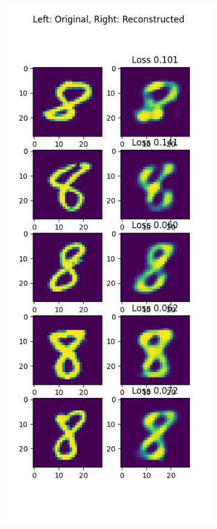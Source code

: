 \begin{solve}
\begin{figure}[H]
\begin{subfigure}{.5\textwidth}
      \end{subfigure}
      \end{figure}
        \begin{figure}[H]
            \begin{subfigure}{.5\textwidth}
                \centering
                \includegraphics[width=.9\linewidth]{plots/output_8.png}

\end{subfigure}
\end{figure}
\end{solve}
